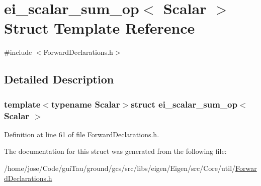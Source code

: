 \hypertarget{structei__scalar__sum__op}{\section{ei\-\_\-scalar\-\_\-sum\-\_\-op$<$ Scalar $>$ Struct Template Reference}
\label{structei__scalar__sum__op}
}


{\ttfamily \#include $<$Forward\-Declarations.\-h$>$}



\subsection{Detailed Description}
\subsubsection*{template$<$typename Scalar$>$struct ei\-\_\-scalar\-\_\-sum\-\_\-op$<$ Scalar $>$}



Definition at line 61 of file Forward\-Declarations.\-h.



The documentation for this struct was generated from the following file\-:\begin{DoxyCompactItemize}
\item 
/home/jose/\-Code/gui\-Tau/ground/gcs/src/libs/eigen/\-Eigen/src/\-Core/util/\hyperlink{_forward_declarations_8h}{Forward\-Declarations.\-h}\end{DoxyCompactItemize}
